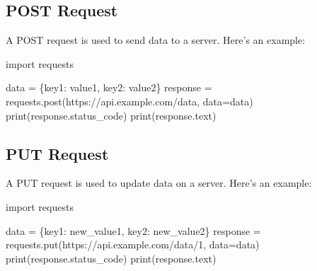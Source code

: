 \documentclass[
  letterpaper,
  DIV=11,
  numbers=noendperiod]{scrreprt}
\newenvironment{Shaded}{\begin{snugshade}}{\end{snugshade}}
\newcommand{\BuiltInTok}[1]{\textcolor[rgb]{0.00,0.23,0.31}{#1}}
\newcommand{\ImportTok}[1]{\textcolor[rgb]{0.00,0.46,0.62}{#1}}
\newcommand{\NormalTok}[1]{\textcolor[rgb]{0.00,0.23,0.31}{#1}}
\newcommand{\OperatorTok}[1]{\textcolor[rgb]{0.37,0.37,0.37}{#1}}
\newcommand{\StringTok}[1]{\textcolor[rgb]{0.13,0.47,0.30}{#1}}
\begin{document}
\subsection{POST Request}\label{post-request}

A POST request is used to send data to a server. Here's an example:

\begin{Shaded}
\begin{Highlighting}[]
\ImportTok{import}\NormalTok{ requests}

\NormalTok{data }\OperatorTok{=}\NormalTok{ \{}\StringTok{\textquotesingle{}key1\textquotesingle{}}\NormalTok{: }\StringTok{\textquotesingle{}value1\textquotesingle{}}\NormalTok{, }\StringTok{\textquotesingle{}key2\textquotesingle{}}\NormalTok{: }\StringTok{\textquotesingle{}value2\textquotesingle{}}\NormalTok{\}}
\NormalTok{response }\OperatorTok{=}\NormalTok{ requests.post(}\StringTok{\textquotesingle{}https://api.example.com/data\textquotesingle{}}\NormalTok{, data}\OperatorTok{=}\NormalTok{data)}
\BuiltInTok{print}\NormalTok{(response.status\_code)}
\BuiltInTok{print}\NormalTok{(response.text)}
\end{Highlighting}
\end{Shaded}

\subsection{PUT Request}\label{put-request}

A PUT request is used to update data on a server. Here's an example:

\begin{Shaded}
\begin{Highlighting}[]
\ImportTok{import}\NormalTok{ requests}

\NormalTok{data }\OperatorTok{=}\NormalTok{ \{}\StringTok{\textquotesingle{}key1\textquotesingle{}}\NormalTok{: }\StringTok{\textquotesingle{}new\_value1\textquotesingle{}}\NormalTok{, }\StringTok{\textquotesingle{}key2\textquotesingle{}}\NormalTok{: }\StringTok{\textquotesingle{}new\_value2\textquotesingle{}}\NormalTok{\}}
\NormalTok{response }\OperatorTok{=}\NormalTok{ requests.put(}\StringTok{\textquotesingle{}https://api.example.com/data/1\textquotesingle{}}\NormalTok{, data}\OperatorTok{=}\NormalTok{data)}
\BuiltInTok{print}\NormalTok{(response.status\_code)}
\BuiltInTok{print}\NormalTok{(response.text)}
\end{Highlighting}
\end{Shaded}
\end{document}
